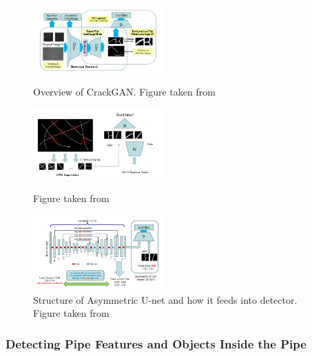 \documentclass[11pt]{article}		%
\begin{document}
        	\begin{figure}[h]
				\centering
				\begin{multicols}{3}
					\includegraphics[width=5cm]{CrackGan_Overview.png}
					\caption{Overview of CrackGAN. Figure taken from \cite{CrackGAN}}
					\label{crackGAN_Overview}
					
					\columnbreak
					
					\includegraphics[width=5cm]{Generative_CPO_CrackGan.png}
					\caption{Figure taken from \cite{CrackGAN1}}
					\label{Generative_CPO_CrackGan}
					
					\columnbreak
					
					\includegraphics[width=5cm]{assymmetric_unet.PNG}
					\caption{Structure of Asymmetric U-net and how it feeds into detector. Figure taken from \cite{CrackGAN1}}
					\label{assymmetric_unet}
				\end{multicols}
			\end{figure}	
				
		\subsubsection{Detecting Pipe Features and Objects Inside the Pipe}
		
\end{document}
